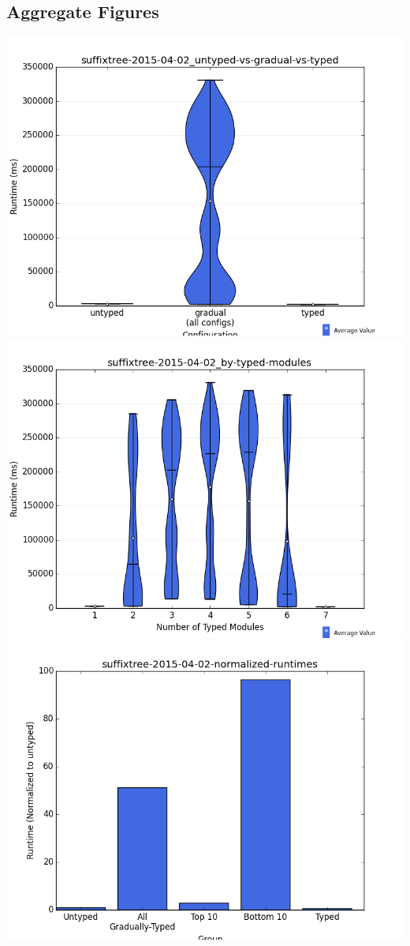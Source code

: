 \documentclass{article}
\begin{document}
\subsection{Aggregate Figures}
\includegraphics[width=\textwidth]{suffixtree-2015-04-02_untyped-vs-gradual-vs-typed-violin.png}
\includegraphics[width=\textwidth]{suffixtree-2015-04-02_by-typed-modules-violin.png}
\includegraphics[width=\textwidth]{suffixtree-2015-04-02-normalized-runtimes-bar.png}
\end{document}
